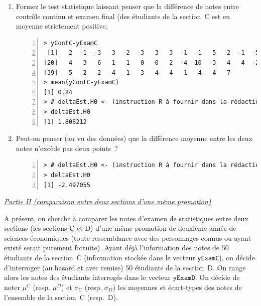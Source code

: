 \documentclass[10pt]{report}
\begin{document}
\begin{exercice}
\begin{enumerate}
\item Formez le test statistique laissant penser que la diff{\'e}rence de notes entre contr{\^o}le continu et examen final (des {\'e}tudiants de la section~C est en moyenne strictement positive.

\IndicR
\begin{Verbatim}[frame=leftline,fontfamily=tt,fontshape=n,numbers=left]
> yContC-yExamC
 [1]   2  -1  -3   3  -2  -3   3   3  -1  -1   5   2  -1  -5   0   1  -5   1  -2
[20]   4   3   6   1   1   0   0   2  -4 -10  -3   4   4  -2   2   3   0  -2   2
[39]   5  -2   2   4  -1   3   4   4   1   4   4   7
> mean(yContC-yExamC)
[1] 0.84
> # deltaEst.H0 <- (instruction R à fournir dans la rédaction)
> deltaEst.H0
[1] 1.808212
\end{Verbatim}

 


\item Peut-on penser (au vu des donn{\'e}es) que la diff{\'e}rence moyenne entre les deux notes n'exc{\`e}de pas deux points~?


\IndicR
\begin{Verbatim}[frame=leftline,fontfamily=tt,fontshape=n,numbers=left]
> # deltaEst.H0 <- (instruction R à fournir dans la rédaction)
> deltaEst.H0
[1] -2.497055
\end{Verbatim}

 


\end{enumerate}








\noindent \underline{\textit{Partie II (comparaison entre deux sections d'une m{\^e}me promotion)}}

A pr{\'e}sent, on cherche {\`a} comparer les notes d'examen de statistiques entre deux sections (les sections C et D) d'une m{\^e}me promotion de deuxi{\`e}me ann{\'e}e de sciences {\'e}conomiques (toute ressemblance avec des personnages connus ou ayant exist{\'e} serait purement fortuite). Ayant d{\'e}j{\`a} l'information des notes de 50 {\'e}tudiants de la section~C (information stock{\'e}e dans le vecteur \texttt{yExamC}), on d{\'e}cide d'interroger (au hasard et avec remise) 50 {\'e}tudiants de la section~D. On range alors les notes des {\'e}tudiants interrog{\'e}s dans le vecteur $\texttt{yExamD}$. On d{\'e}cide de noter $\mu^C$ (resp. $\mu^D$) et $\sigma_C$ (resp. $\sigma_D$) les moyennes et {\'e}cart-types des notes de l'ensemble de la section~C (resp.~D).\\


\end{exercice}
\end{document}
